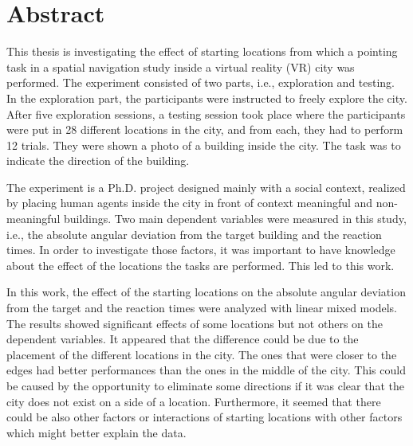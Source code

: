 \chapter*{Abstract}\label{cha:abstract}


This thesis is investigating the effect of starting locations from which a pointing task in a spatial navigation study inside a virtual reality (VR) city was performed. The experiment consisted of two parts, i.e., exploration and testing. In the exploration part, the participants were instructed to freely explore the city. After five exploration sessions, a testing session took place where the participants were put in 28 different locations in the city, and from each, they had to perform 12 trials. They were shown a photo of a building inside the city. The task was to indicate the direction of the building.

The experiment is a Ph.D. project designed mainly with a social context, realized by placing human agents inside the city in front of context meaningful and non-meaningful buildings. Two main dependent variables were measured in this study, i.e., the absolute angular deviation from the target building and the reaction times. In order to investigate those factors, it was important to have knowledge about the effect of the locations the tasks are performed. This led to this work.

In this work, the effect of the starting locations on the absolute angular deviation from the target and the reaction times were analyzed with linear mixed models. The results showed significant effects of some locations but not others on the dependent variables. It appeared that the difference could be due to the placement of the different locations in the city. The ones that were closer to the edges had better performances than the ones in the middle of the city. This could be caused by the opportunity to eliminate some directions if it was clear that the city does not exist on a side of a location. Furthermore, it seemed that there could be also other factors or interactions of starting locations with other factors which might better explain the data.